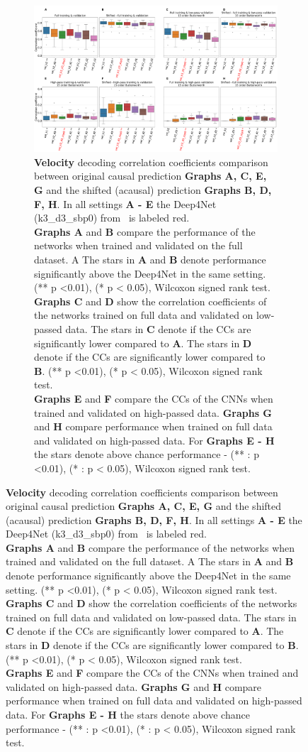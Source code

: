 \begin{figure}[!htpb]
\centering
\begin{subfigure}[t]{\textwidth}
   \includegraphics[width=1\linewidth]{img/ch4/original_vs_shifted_vel_performance_comparison}
   \caption[Velocity: non-shifted vs. shifted setting performances]{\textbf{Velocity} decoding correlation coefficients comparison between original causal prediction \textbf{Graphs A, C, E, G} and the shifted (acausal) prediction \textbf{Graphs B, D, F, H}. In all settings \textbf{
   A - E} the Deep4Net (k3\_d3\_sbp0) from~\cite{Hammer-2021} is labeled red.\\ \textbf{Graphs A} and \textbf{B} compare the performance of the networks when trained and validated on the full dataset. A The stars in \textbf{A} and \textbf{B} denote performance significantly above the Deep4Net in the same setting. (** p <0.01), (* p < 0.05), Wilcoxon signed rank test.
   \\\textbf{Graphs C} and \textbf{D} show the correlation coefficients of the networks trained on full data and validated on low-passed data. 
   The stars in \textbf{C} denote if the CCs are significantly lower compared to \textbf{A}. The stars in \textbf{D} denote if the CCs are significantly lower compared to \textbf{B}. (** p <0.01), (* p < 0.05), Wilcoxon signed rank test.
   \\\textbf{Graphs E} and \textbf{F} compare the CCs of the CNNs when trained and validated on high-passed data. \textbf{Graphs G} and \textbf{H} compare performance when trained on full data and validated on high-passed data. For \textbf{Graphs E - H} the stars denote above chance performance - (** : p <0.01), (* : p < 0.05), Wilcoxon signed rank test.}
   \label{fig:shifted-performance-vel}
\end{subfigure}
\end{figure}
\clearpage   

